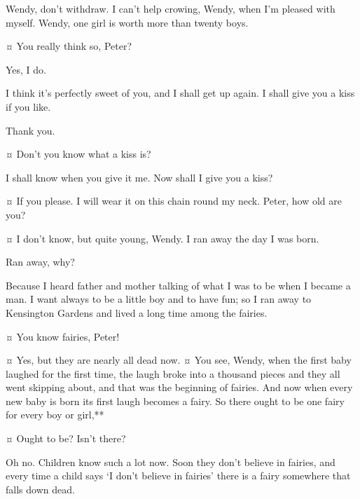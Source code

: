 \begin{drama}

\peterspeaks
Wendy, don’t withdraw.
I can’t help crowing, Wendy, when I’m pleased with myself.
Wendy, one girl is worth more than twenty boys.

\wendyspeaks {}¤
You really think so, Peter?

\peterspeaks
Yes, I do.

\wendyspeaks
I think it’s perfectly sweet of you, and I shall get up again.
I shall give you a kiss if you like.

\peterspeaks
Thank you.

\wendyspeaks {}¤
Don’t you know what a kiss is?

\peterspeaks
I shall know when you give it me.
Now shall I give you a kiss?

\wendyspeaks {}¤
If you please.
I will wear it on this chain round my neck.
Peter, how old are you?

\peterspeaks {}¤
I don’t know, but quite young, Wendy.
I ran away the day I was born.

\wendyspeaks
Ran away, why?

\peterspeaks
Because I heard father and mother talking of what I was to be when I became a man.
I want always to be a little boy and to have fun;
so I ran away to Kensington Gardens and lived a long time among the fairies.

\wendyspeaks {}¤
You know fairies, Peter!

\peterspeaks {}¤
Yes, but they are nearly all dead now.
¤
You see, Wendy, when the first baby laughed for the first time,
the laugh broke into a thousand pieces and they all went skipping about,
and that was the beginning of fairies.
And now when every new baby is born its first laugh becomes a fairy.
So there ought to be one fairy for every boy or girl,**

\wendyspeaks {}¤
Ought to be?
Isn’t there?

\peterspeaks
Oh no.
Children know such a lot now.
Soon they don’t believe in fairies,
and every time a child says ‘I don’t believe in fairies’ there is a fairy somewhere that falls down dead.


\end{drama}
